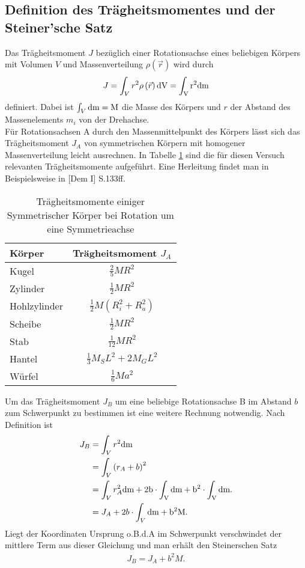 \documentclass[12pt, a4paper, twoside]{scrartcl}
\begin{document}
\subsection{Definition des Trägheitsmomentes und der Steiner'sche Satz}
Das Trägheitsmoment $J$ bezüglich einer Rotationsachse eines beliebigen Körpers mit Volumen $V$ und Massenverteilung $\rho\left(\vec{r}\right)$ wird durch
\begin{align*}
J=\int_Vr^2\rho\left(\vec{r}\right)\rm dV=\int_Vr^2\rm dm
\end{align*}
definiert. Dabei ist $\int_V\rm dm=M$ die Masse des Körpers und $r$ der Abstand des Massenelements $m_i$ von der Drehachse.\\

Für Rotationsachsen A durch den Massenmittelpunkt des Körpers lässt sich das Trägheitsmoment $J_A$ von symmetrischen Körpern mit homogener Massenverteilung leicht ausrechnen. In Tabelle \ref{tab:beispiele} sind die für diesen Versuch relevanten Trägheitsmomente aufgeführt. Eine Herleitung findet man in Beispielsweise in [Dem I] S.133ff.
\renewcommand{\arraystretch}{1.5}
\begin{table}[H]
\centering
\begin{tabular}{|l|c|}
	\hline
    Körper & Trägheitsmoment $J_A$ \\
    \hline\hline
    Kugel & $\frac{2}{5}MR^2$ \\ \hline
    Zylinder & $\frac{1}{2}MR^2$ \\ \hline
    Hohlzylinder & $\frac{1}{2}M(R_i^2+R_a^2)$ \\ \hline
    Scheibe & $\frac{1}{2}MR^2$ \\ \hline
    Stab & $\frac{1}{12}MR^2$ \\ \hline
    Hantel\footnotemark & $\frac{1}{3}M_SL^2+2M_GL^2$ \\ \hline
    Würfel & $\frac{1}{6}Ma^2$ \\ \hline 
 \end{tabular} 
 \caption{\label{tab:beispiele}Trägheitsmomente einiger Symmetrischer Körper bei Rotation um eine Symmetrieachse}
\end{table}
Um das Trägheitsmoment $J_B$ um eine beliebige Rotationsachse B im Abstand $b$ zum Schwerpunkt zu bestimmen ist eine weitere Rechnung notwendig. Nach Definition ist
\begin{align*}
J_B&=\int_Vr^2\rm dm \\
	&=\int_V\left(r_{A}+b\right)^2 \\
	&=\int_Vr_A^2\rm dm+2b\cdot\int_V\rm dm+b^2\cdot\int_V\rm dm. \\
	&=J_A+2b\cdot\int_V\rm dm+b^2M.
\end{align*}
Liegt der Koordinaten Ursprung o.B.d.A im Schwerpunkt verschwindet der mittlere Term aus dieser Gleichung und man erhält den Steinerschen Satz
\begin{align*}
J_B=J_A+b^2M.
\end{align*}
\end{document}
